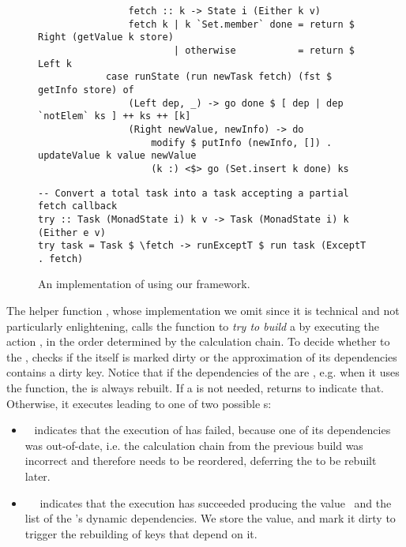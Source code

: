 \begin{figure}
\begin{verbatim}
                fetch :: k -> State i (Either k v)
                fetch k | k `Set.member` done = return $ Right (getValue k store)
                        | otherwise           = return $ Left k
            case runState (run newTask fetch) (fst $ getInfo store) of
                (Left dep, _) -> go done $ [ dep | dep `notElem` ks ] ++ ks ++ [k]
                (Right newValue, newInfo) -> do
                    modify $ putInfo (newInfo, []) . updateValue k value newValue
                    (k :) <$> go (Set.insert k done) ks
\end{verbatim}
\vspace{1mm}
\begin{verbatim}
-- Convert a total task into a task accepting a partial fetch callback
try :: Task (MonadState i) k v -> Task (MonadState i) k (Either e v)
try task = Task $ \fetch -> runExceptT $ run task (ExceptT . fetch)
\end{verbatim}
\vspace{-2mm}
\caption{An implementation of \Excel using our framework.}\label{fig-excel-implementation}
\vspace{-2mm}
\end{figure}

The helper function , whose implementation we omit since it is
technical and not particularly enlightening, calls the function  to
\emph{try to build} a  by executing the action , in the order
determined by the calculation chain. To decide whether to  the
,  checks if the  itself is marked dirty or the
approximation of its dependencies contains a dirty key. Notice that if the
dependencies of the  are , e.g. when it uses the
 function, the  is always rebuilt. If a  is
not needed,  returns  to indicate that. Otherwise, it
executes  leading to one of two possible s:

\begin{itemize}
    \item {}~ indicates that the execution of  has
    failed, because one of its dependencies  was out-of-date, i.e. the
    calculation chain from the previous build was incorrect and therefore needs
    to be reordered, deferring the  to be rebuilt later.
    \item {}~~ indicates that the
    execution has succeeded producing the value~ and the list of the
    's dynamic dependencies. We store the value, and mark it dirty to
    trigger the rebuilding of keys that depend on it.
\end{itemize}

